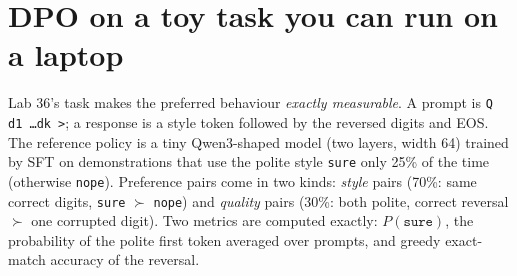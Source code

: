 \section{DPO on a toy task you can run on a laptop}\label{sec:dpo:toy}

Lab 36's task makes the preferred behaviour \emph{exactly measurable}. A prompt is
\texttt{Q d1 \ldots dk >}; a response is a style token followed by the reversed digits and EOS. The
reference policy is a tiny Qwen3-shaped model (two layers, width 64) trained by SFT on
demonstrations that use the polite style \texttt{sure} only 25\% of the time (otherwise
\texttt{nope}). Preference pairs come in two kinds: \emph{style} pairs (70\%: same correct digits,
\texttt{sure} $\succ$ \texttt{nope}) and \emph{quality} pairs (30\%: both polite, correct reversal
$\succ$ one corrupted digit). Two metrics are computed exactly: $P(\texttt{sure})$, the
probability of the polite first token averaged over prompts, and greedy exact-match accuracy of the
reversal.

